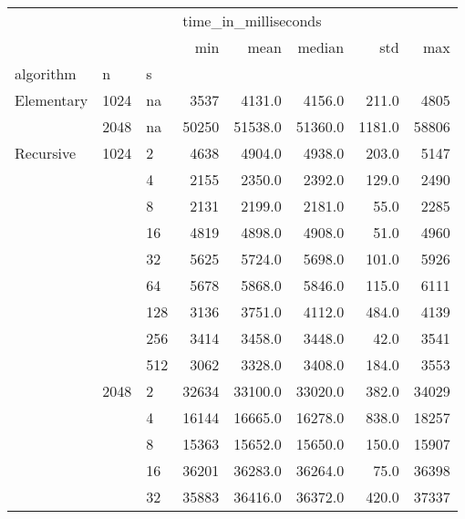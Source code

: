 \begin{tabular}{lllrrrrr}
\toprule
           &      &      & \multicolumn{5}{l}{time\_in\_milliseconds} \\
           &      &      &                  min &      mean &    median &      std &     max \\
algorithm & n & s &                      &           &           &          &         \\
\midrule
Elementary & 1024 & na &                 3537 &    4131.0 &    4156.0 &    211.0 &    4805 \\
           & 2048 & na &                50250 &   51538.0 &   51360.0 &   1181.0 &   58806 \\
Recursive & 1024 & 2 &                 4638 &    4904.0 &    4938.0 &    203.0 &    5147 \\
           &      & 4 &                 2155 &    2350.0 &    2392.0 &    129.0 &    2490 \\
           &      & 8 &                 2131 &    2199.0 &    2181.0 &     55.0 &    2285 \\
           &      & 16 &                 4819 &    4898.0 &    4908.0 &     51.0 &    4960 \\
           &      & 32 &                 5625 &    5724.0 &    5698.0 &    101.0 &    5926 \\
           &      & 64 &                 5678 &    5868.0 &    5846.0 &    115.0 &    6111 \\
           &      & 128 &                 3136 &    3751.0 &    4112.0 &    484.0 &    4139 \\
           &      & 256 &                 3414 &    3458.0 &    3448.0 &     42.0 &    3541 \\
           &      & 512 &                 3062 &    3328.0 &    3408.0 &    184.0 &    3553 \\
           & 2048 & 2 &                32634 &   33100.0 &   33020.0 &    382.0 &   34029 \\
           &      & 4 &                16144 &   16665.0 &   16278.0 &    838.0 &   18257 \\
           &      & 8 &                15363 &   15652.0 &   15650.0 &    150.0 &   15907 \\
           &      & 16 &                36201 &   36283.0 &   36264.0 &     75.0 &   36398 \\
           &      & 32 &                35883 &   36416.0 &   36372.0 &    420.0 &   37337 \\

\end{tabular}
